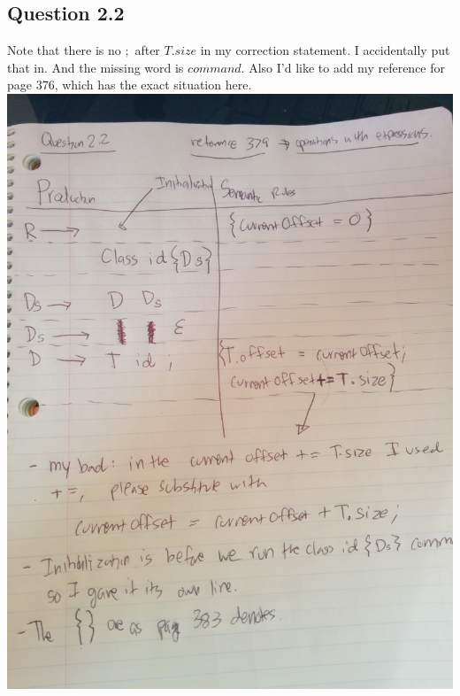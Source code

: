 \documentclass[11pt, oneside]{article}   	%
\begin{document}
\newpage

\subsection*{Question 2.2}
\par Note that there is no $;$ after $T.size$ in my correction statement. I accidentally put that in. And the missing word is $command$. Also I'd like to add my reference for page 376, which has the exact situation here.
\\
\includegraphics[scale=0.15]{IMG_20141011_154642.jpg}

\newpage
\end{document}
